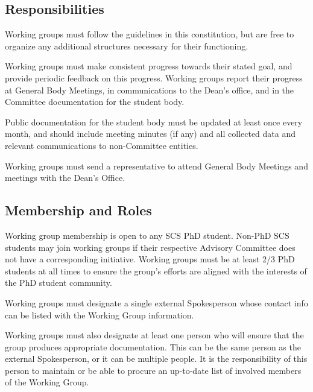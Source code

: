 \documentclass{article}
\begin{document}
\subsection{Responsibilities}
Working groups must follow the guidelines in this constitution, but are free to organize any additional structures necessary for their functioning.

Working groups must make consistent progress towards their stated goal, and provide periodic feedback on this progress. Working groups report their progress at General Body Meetings, in communications to the Dean's office, and in the Committee documentation for the student body.

Public documentation for the student body must be updated at least once every month, and should include meeting minutes (if any) and all collected data and relevant communications to non-Committee entities.
 
Working groups must send a representative to attend General Body Meetings and  meetings with the Dean's Office.%

\subsection{Membership and Roles}
Working group membership is open to any SCS PhD student. 
Non-PhD SCS students may join working groups if their respective Advisory Committee does not have a corresponding initiative. Working groups must be at least 2/3 PhD students at all times to ensure the group's efforts are aligned with the interests of the PhD student community.

Working groups must designate a single external Spokesperson whose contact info can be listed with the Working Group information.

Working groups must also designate at least one person who will ensure that the group produces appropriate documentation. This can be the same person as the external Spokesperson, or it can be multiple people. It is the responsibility of this person to maintain or be able to procure an up-to-date list of involved members of the Working Group.
\end{document}
